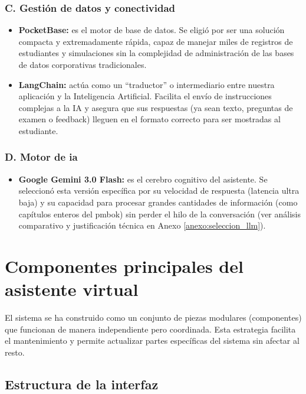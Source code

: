 \subsubsection{C. Gestión de datos y conectividad}
\begin{itemize}
\item \textbf{PocketBase:} es el motor de base de datos. Se eligió por ser una solución compacta y extremadamente rápida, capaz de manejar miles de registros de estudiantes y simulaciones sin la complejidad de administración de las bases de datos corporativas tradicionales.
\item \textbf{LangChain:} actúa como un ``traductor'' o intermediario entre nuestra aplicación y la Inteligencia Artificial. Facilita el envío de instrucciones complejas a la IA y asegura que sus respuestas (ya sean texto, preguntas de examen o feedback) lleguen en el formato correcto para ser mostradas al estudiante.
\end{itemize}

\subsubsection{D. Motor de \gls{ia}}
\begin{itemize}
\item \textbf{Google Gemini 3.0 Flash:} es el cerebro cognitivo del asistente. Se seleccionó esta versión específica por su velocidad de respuesta (latencia ultra baja) y su capacidad para procesar grandes cantidades de información (como capítulos enteros del \gls{pmbok}) sin perder el hilo de la conversación (ver análisis comparativo y justificación técnica en Anexo \ref{anexo:seleccion_llm}).
\end{itemize}
\section{Componentes principales del asistente virtual}
El sistema se ha construido como un conjunto de piezas modulares (componentes) que funcionan de manera independiente pero coordinada. Esta estrategia facilita el mantenimiento y permite actualizar partes específicas del sistema sin afectar al resto.

\subsection{Estructura de la interfaz}

